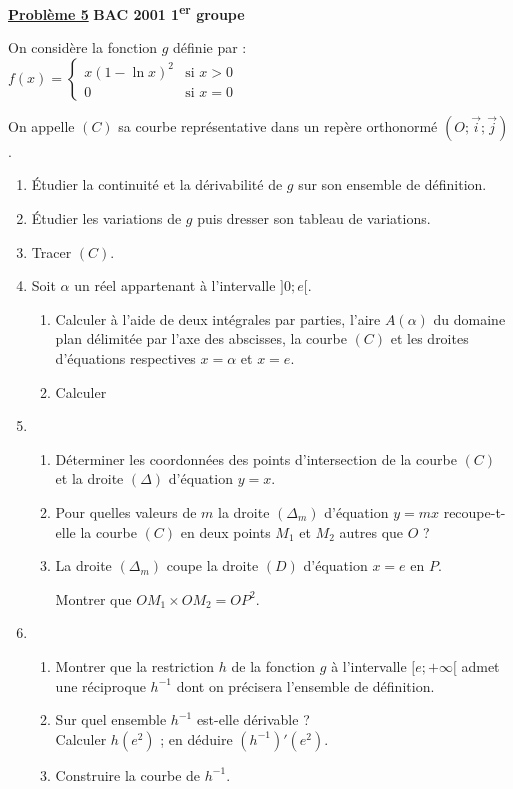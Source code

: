 \documentclass[12pt,a4paper]{article}
\newcommand{\exo}[1]{%
        \textbf{\underline{Problème #1}}
}
\begin{document}
\begin{multicols}{2}
\exo{5} \textbf{BAC 2001 1\textsuperscript{er} groupe}

On considère la fonction \( g \) définie par :\\
\(
f(x) =
\begin{cases}
x(1 - \ln x)^2 & \text{si } x > 0 \\
0 & \text{si } x = 0
\end{cases}
\)

On appelle \( (C) \) sa courbe représentative dans un repère orthonormé \( (O ; \vec{i} ; \vec{j}) \).

\begin{enumerate}
    \item Étudier la continuité et la dérivabilité de \( g \) sur son ensemble de définition.
    \item Étudier les variations de \( g \) puis dresser son tableau de variations.
    \item Tracer \( (C) \).
    \item Soit \( \alpha \) un réel appartenant à l’intervalle \( ]0 ; e[ \).
    \begin{enumerate}
        \item Calculer à l’aide de deux intégrales par parties, l’aire \( A(\alpha) \) du domaine plan délimitée par l’axe des abscisses, la courbe \( (C) \) et les droites d’équations respectives \( x = \alpha \) et \( x = e \).
        \item Calculer
    \end{enumerate}
    \item
    \begin{enumerate}
        \item Déterminer les coordonnées des points d’intersection de la courbe \( (C) \) et la droite \( (\Delta) \) d’équation \( y = x \).
        \item Pour quelles valeurs de \( m \) la droite \( (\Delta_m) \) d’équation \( y = mx \) recoupe-t-elle la courbe \( (C) \) en deux points \( M_1 \) et \( M_2 \) autres que \( O \) ?
        \item La droite \( (\Delta_m) \) coupe la droite \( (D) \) d’équation \( x = e \) en \( P \). 
        
        Montrer que \( OM_1 \times OM_2 = OP^2 \).
    \end{enumerate}

    \item
    \begin{enumerate}
        \item Montrer que la restriction \( h \) de la fonction \( g \) à l’intervalle \( [e ; +\infty[ \) admet une réciproque \( h^{-1} \) dont on précisera l’ensemble de définition.
        \item Sur quel ensemble \( h^{-1} \) est-elle dérivable ?\\
        Calculer \( h(e^2) \) ; en déduire \( (h^{-1})'(e^2) \).
        \item Construire la courbe de \( h^{-1} \).
    \end{enumerate}


\end{enumerate}
\end{multicols}
\end{document}
